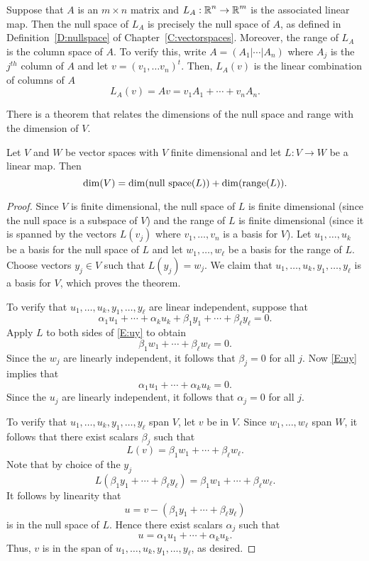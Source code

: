 \documentclass{ximera}
\begin{document}
Suppose that $A$ is an $m\times n$ matrix and $L_A:\mbox{$\Bbb{R}$}^n\to\mbox{$\Bbb{R}$}^m$ is the
associated linear map.  Then the null space of $L_A$ is precisely the null
space of $A$, as defined in Definition~\ref{D:nullspace} of 
Chapter~\ref{C:vectorspaces}.  Moreover, the range of $L_A$ is the column 
space of $A$.  To verify this, write $A=(A_1|\cdots|A_n)$ where $A_j$ is the 
$j^{th}$ column of $A$ and let $v=(v_1,\ldots v_n)^t$.  Then, $L_A(v)$ is the 
linear combination of columns of $A$
\[
L_A(v)=Av = v_1A_1+\cdots+v_nA_n.
\]

There is a theorem that relates the dimensions of the null space and range
with the dimension of $V$.
\begin{theorem}  \label{T:nsr}
Let $V$ and $W$ be vector spaces with $V$ finite dimensional and let
$L:V\to W$ be a linear map.  Then
\[
\dim(V) = \dim(\mbox{\rm null space}(L)) + \dim({\rm range}(L)).
\] 
\end{theorem}

\begin{proof}   Since $V$ is finite dimensional, the null space of $L$ is finite 
dimensional (since the null space is a subspace of $V$) and the range of $L$ 
is finite dimensional (since it is spanned by the vectors $L(v_j)$ where 
$v_1,\ldots,v_n$ is a basis for $V$).  Let $u_1,\ldots,u_k$ be a basis for 
the null space of $L$ and let $w_1,\ldots,w_\ell$ be a basis for the range of
$L$.   Choose vectors $y_j\in V$ such that $L(y_j)=w_j$.  We claim that
$u_1,\ldots,u_k,y_1,\ldots,y_\ell$ is a basis for $V$, which proves the
theorem.

To verify that $u_1,\ldots,u_k,y_1,\ldots,y_\ell$ are linear independent,
suppose that
\begin{equation}  \label{E:uy}
\alpha_1u_1+\cdots+\alpha_ku_k+\beta_1y_1+\cdots+\beta_\ell y_\ell = 0.
\end{equation}
Apply $L$ to both sides of \eqref{E:uy} to obtain
\[
\beta_1w_1+\cdots+\beta_\ell w_\ell = 0.
\]
Since the $w_j$ are linearly independent, it follows that $\beta_j=0$ for all
$j$.  Now  \eqref{E:uy} implies that
\[
\alpha_1u_1+\cdots+\alpha_ku_k = 0.
\]
Since the $u_j$ are linearly independent, it follows that $\alpha_j=0$ for
all $j$.

To verify that $u_1,\ldots,u_k,y_1,\ldots,y_\ell$ span $V$, let $v$ be in
$V$.  Since $w_1,\ldots,w_\ell$ span $W$, it follows that there exist scalars
$\beta_j$ such that
\[
L(v) = \beta_1w_1+\cdots+\beta_\ell w_\ell.
\]
Note that by choice of the $y_j$
\[
L(\beta_1y_1+\cdots+\beta_\ell y_\ell) = \beta_1w_1+\cdots+\beta_\ell w_\ell.
\]
It follows by linearity that
\[
u = v - (\beta_1y_1+\cdots+\beta_\ell y_\ell)
\]
is in the null space of $L$.  Hence there exist scalars $\alpha_j$ such that
\[
u = \alpha_1u_1+\cdots+\alpha_ku_k.
\]
Thus, $v$ is in the span of $u_1,\ldots,u_k,y_1,\ldots,y_\ell$, as desired.
\end{proof}
\end{document}
